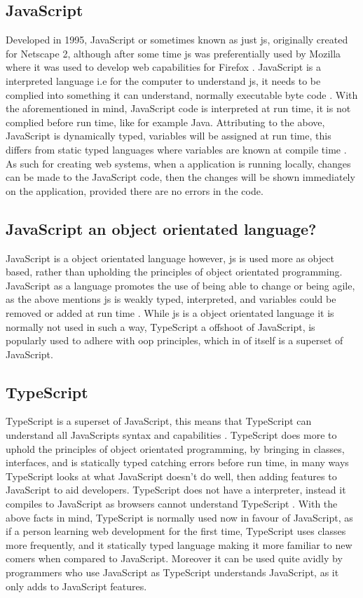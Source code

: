 \subsection{JavaScript}
Developed in 1995, JavaScript or sometimes known as just js, originally created for Netscape 2, although after some time js was preferentially used by Mozilla where it was used to develop web capabilities for Firefox \cite{HistoryJS}. JavaScript is a interpreted language i.e for the computer to understand js, it needs to be complied into something it can understand, normally executable byte code \cite{wilton2004beginning}. With the aforementioned in mind, JavaScript code is interpreted at run time, it is not complied before run time, like for example Java. Attributing to the above, JavaScript is dynamically typed, variables will be assigned at run time, this differs from static typed languages where variables are known at compile time \cite{richards2010analysis}. As such for creating web systems, when a application is running locally, changes can be made to the JavaScript code, then the changes will be shown immediately on the application, provided there are no errors in the code.

\subsection{JavaScript an object orientated language?}
JavaScript is a object orientated language however, js is used more as object based, rather than upholding the principles of object orientated programming. JavaScript as a language promotes the use of being able to change or being agile, as the above mentions js is weakly typed, interpreted, and variables could be removed or added at run time \cite{theisen2019programming}. While js is a object orientated language it is normally not used in such a way, TypeScript a offshoot of JavaScript, is popularly used to adhere with oop principles, which in of itself is a superset of JavaScript.

\subsection{TypeScript}
TypeScript is a superset of JavaScript, this means that TypeScript can understand all JavaScripts syntax and capabilities \cite{cherny2019programming}. TypeScript does more to uphold the principles of object orientated programming, by bringing in classes, interfaces, and is statically typed \cite{bierman2014understanding} catching errors before run time, in many ways TypeScript looks at what JavaScript doesn't do well, then adding features to JavaScript to aid developers. TypeScript does not have a interpreter, instead it compiles to JavaScript as browsers cannot understand TypeScript \cite{jansen2016typescript}. With the above facts in mind, TypeScript is normally used now in favour of JavaScript, as if a person learning web development for the first time, TypeScript uses classes more frequently, and it statically typed language making it more familiar to new comers when compared to JavaScript. Moreover it can be used quite avidly by programmers who use JavaScript as TypeScript understands JavaScript, as it only adds to JavaScript features.

